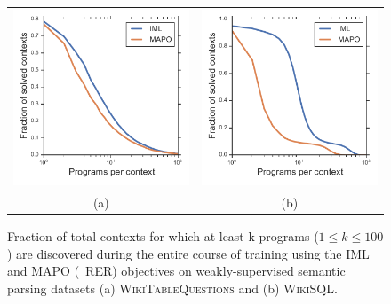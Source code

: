 \begin{figure}[t]
  \begin{center}
    \begin{tabular}{@{}c@{}c@{}}
      \includegraphics[width=.51\columnwidth]{wtq_iml_mapo} & \includegraphics[width=.51\columnwidth]{wikisql_iml_mapo} \\[-.2cm]
      (a) & (b) \\
    \end{tabular}
    \vspace*{-0.1in}
    \caption{Fraction of total contexts for which at least k programs ($\displaystyle 1 \le k \le 100$) are discovered
    during the entire course of training using the IML and MAPO (\ie~RER)
    objectives on weakly-supervised semantic parsing datasets
    (a) \textsc{WikiTableQuestions} and (b) \textsc{WikiSQL}.
    } \label{fig:mapo_iml_comparison} \end{center}
\label{fig:exploration}
\vspace*{-0.35in}
\end{figure}

